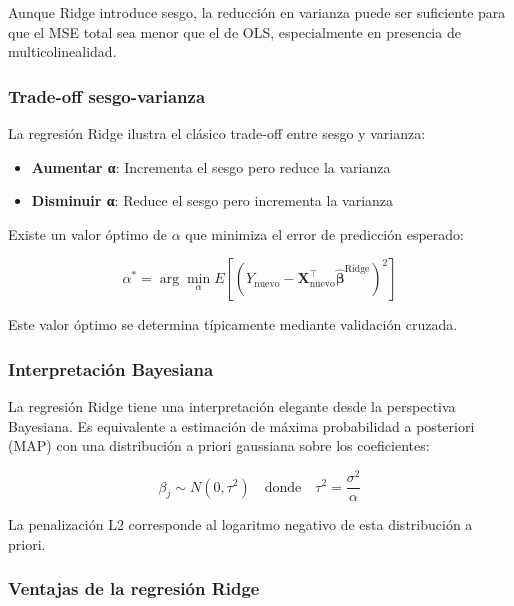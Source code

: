\documentclass[
  doc,
  floatsintext,
  longtable,
  a4paper,
  nolmodern,
  notxfonts,
  notimes,
  12pt,
  colorlinks=true,linkcolor=blue,citecolor=blue,urlcolor=blue]{apa7}
\providecommand{\tightlist}{%
  \setlength{\itemsep}{0pt}\setlength{\parskip}{0pt}}
\begin{document}
Aunque Ridge introduce sesgo, la reducción en varianza puede ser
suficiente para que el MSE total sea menor que el de OLS, especialmente
en presencia de multicolinealidad.

\subsubsection{Trade-off sesgo-varianza}\label{trade-off-sesgo-varianza}

La regresión Ridge ilustra el clásico trade-off entre sesgo y varianza:

\begin{itemize}
\tightlist
\item
  \textbf{Aumentar α}: Incrementa el sesgo pero reduce la varianza
\item
  \textbf{Disminuir α}: Reduce el sesgo pero incrementa la varianza
\end{itemize}

Existe un valor óptimo de \(\alpha\) que minimiza el error de predicción
esperado:

\[
\alpha^* = \arg\min_{\alpha} E[(Y_{\text{nuevo}} - \mathbf{X}_{\text{nuevo}}^\top\hat{\boldsymbol{\beta}}^{\text{Ridge}})^2]
\]

Este valor óptimo se determina típicamente mediante validación cruzada.

\subsubsection{Interpretación
Bayesiana}\label{interpretaciuxf3n-bayesiana}

La regresión Ridge tiene una interpretación elegante desde la
perspectiva Bayesiana. Es equivalente a estimación de máxima
probabilidad a posteriori (MAP) con una distribución a priori gaussiana
sobre los coeficientes:

\[
\beta_j \sim N(0, \tau^2) \quad \text{donde} \quad \tau^2 = \frac{\sigma^2}{\alpha}
\]

La penalización L2 corresponde al logaritmo negativo de esta
distribución a priori.

\subsubsection{Ventajas de la regresión
Ridge}\label{ventajas-de-la-regresiuxf3n-ridge}
\end{document}
